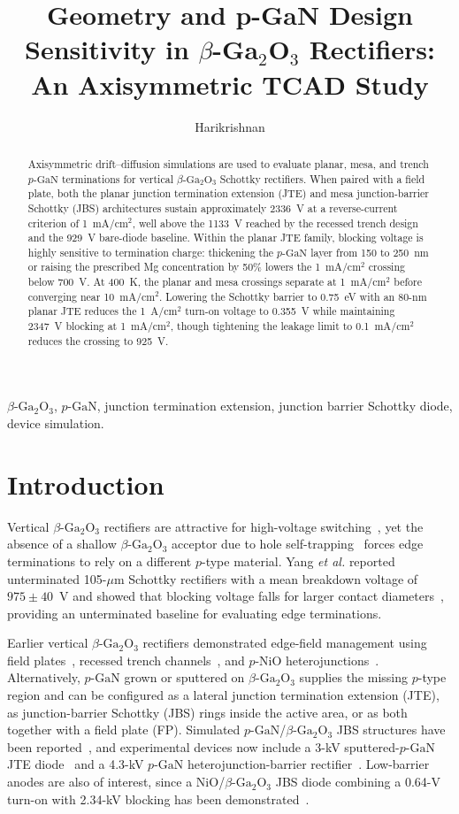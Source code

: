 \documentclass[journal,10pt]{IEEEtran}
\title{Geometry and p-GaN Design Sensitivity in \texorpdfstring{$\beta$-Ga$_2$O$_3$}{beta-Ga2O3} Rectifiers: An Axisymmetric TCAD Study}
\author{Harikrishnan}
\newcommand{\GaO}{\ensuremath{\beta\text{-}\mathrm{Ga}_2\mathrm{O}_3}}
\newcommand{\pGaN}{\ensuremath{p\text{-}\mathrm{GaN}}}
\begin{document}
\maketitle

\begin{abstract}
Axisymmetric drift--diffusion simulations are used to evaluate planar, mesa, and trench \pGaN{} terminations for vertical \GaO{} Schottky rectifiers. When paired with a field plate, both the planar junction termination extension (JTE) and mesa junction-barrier Schottky (JBS) architectures sustain approximately 2336~V at a reverse-current criterion of 1~mA/cm$^2$, well above the 1133~V reached by the recessed trench design and the 929~V bare-diode baseline. Within the planar JTE family, blocking voltage is highly sensitive to termination charge: thickening the \pGaN{} layer from 150 to 250~nm or raising the prescribed Mg concentration by 50\% lowers the 1~mA/cm$^2$ crossing below 700~V. At 400~K, the planar and mesa crossings separate at 1~mA/cm$^2$ before converging near 10~mA/cm$^2$. Lowering the Schottky barrier to 0.75~eV with an 80-nm planar JTE reduces the 1~A/cm$^2$ turn-on voltage to 0.355~V while maintaining 2347~V blocking at 1~mA/cm$^2$, though tightening the leakage limit to 0.1~mA/cm$^2$ reduces the crossing to 925~V.
\end{abstract}

\begin{IEEEkeywords}
\GaO, \pGaN, junction termination extension, junction barrier Schottky diode, device simulation.
\end{IEEEkeywords}

\section{Introduction}
Vertical \GaO{} rectifiers are attractive for high-voltage switching~\cite{Pearton2018_APR}, yet the absence of a shallow \GaO{} acceptor due to hole self-trapping~\cite{Varley2012_PRB} forces edge terminations to rely on a different $p$-type material. Yang \emph{et al.} reported unterminated 105-$\mu$m Schottky rectifiers with a mean breakdown voltage of $975\pm40$~V and showed that blocking voltage falls for larger contact diameters~\cite{Yang2017}, providing an unterminated baseline for evaluating edge terminations.

Earlier vertical \GaO{} rectifiers demonstrated edge-field management using field plates~\cite{Konishi2017_APL}, recessed trench channels~\cite{Li2020_EDL}, and $p$-NiO heterojunctions~\cite{Gong2020_APL}. Alternatively, \pGaN{} grown or sputtered on \GaO{} supplies the missing $p$-type region and can be configured as a lateral junction termination extension (JTE), as junction-barrier Schottky (JBS) rings inside the active area, or as both together with a field plate (FP). Simulated \pGaN/\GaO{} JBS structures have been reported~\cite{Nandi2021_TED,Than2024_PhysScr}, and experimental devices now include a 3-kV sputtered-\pGaN{} JTE diode~\cite{Chang2025_APL} and a 4.3-kV \pGaN{} heterojunction-barrier rectifier~\cite{Chang2026_TED}. Low-barrier anodes are also of interest, since a NiO/\GaO{} JBS diode combining a 0.64-V turn-on with 2.34-kV blocking has been demonstrated~\cite{Su2024_APL}.
\end{document}
